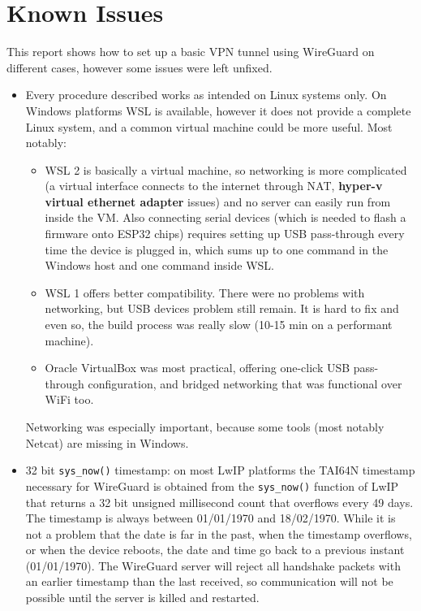 \section{Known Issues}\label{sec:problems}
This report shows how to set up a basic VPN tunnel using WireGuard on different cases, however some issues were left unfixed.
\begin{itemize}
    \item Every procedure described works as intended on Linux systems only. On Windows platforms WSL is available, however it does not provide a complete Linux system, and a common virtual machine could be more useful. Most notably:
    \begin{itemize}
        \item WSL 2 is basically a virtual machine, so networking is more complicated (a virtual interface connects to the internet through NAT, \textbf{hyper-v virtual ethernet adapter} issues) and no server can easily run from inside the VM. Also connecting serial devices (which is needed to flash a firmware onto ESP32 chips) requires setting up USB pass-through every time the device is plugged in, which sums up to one command in the Windows host and one command inside WSL.
        \item WSL 1 offers better compatibility. There were no problems with networking, but USB devices problem still remain. It is hard to fix and even so, the build process was really slow (10-15 min on a performant machine). 
        \item Oracle VirtualBox was most practical, offering one-click USB pass-through configuration, and bridged networking that was functional over WiFi too.
    \end{itemize}
    Networking was especially important, because some tools (most notably Netcat) are missing in Windows.
    
    \item 32 bit \texttt{sys\_now()} timestamp: on most LwIP platforms the TAI64N timestamp necessary for WireGuard is obtained from the \texttt{sys\_now()} function of LwIP that returns a 32 bit unsigned millisecond count that overflows every 49 days. The timestamp is always between 01/01/1970 and 18/02/1970. While it is not a problem that the date is far in the past, when the timestamp overflows, or when the device reboots, the date and time go back to a previous instant (01/01/1970). The WireGuard server will reject all handshake packets with an earlier timestamp than the last received, so communication will not be possible until the server is killed and restarted.
    

\end{itemize}
